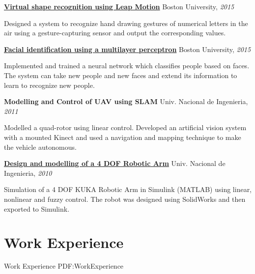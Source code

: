 \documentclass[letterpaper,MMMyyyy,nonstop]{simpleresumecv}
\begin{document}
\begin{body}
\BigGap
\href{http://www.bu.edu/vip/files/pubs/reports/DLDP15-03buece.pdf}
{\textbf{Virtual shape recognition using Leap Motion}}
\hfill
Boston University, \textit{2015}

\GapNoBreak
\BulletItem
Designed a system to recognize hand drawing gestures of numerical letters in the air using a gesture-capturing sensor and  output the corresponding values.
\GapNoBreak

\BigGap
\href{https://docs.google.com/presentation/d/1328Qvm9VlAZadwlNoU3n5m1REY36m_hGcakSYlxW2vM/edit?ts=565d2938#slide=id.p}
{\textbf{Facial identification using a multilayer perceptron}}
\hfill
Boston University, \textit{2015}

\GapNoBreak
\BulletItem
Implemented and trained a neural network which classifies people based on faces. The system can take new people and new faces and extend its information to learn to recognize new people.
\GapNoBreak

\BigGap
\textbf{Modelling and Control of UAV using SLAM}
\hfill
Univ. Nacional de Ingenieria, \textit{2011}

\GapNoBreak
\BulletItem
Modelled a quad-rotor using linear control. Developed an artificial vision system with a mounted Kinect and used a navigation and mapping technique to make the vehicle autonomous.
\GapNoBreak

\BigGap
\href{https://github.com/davidlavy88/resume/blob/master/Paper/paper-mt-517.pdf}
{\textbf{Design and modelling of a 4 DOF Robotic Arm}}
\hfill
Univ. Nacional de Ingenieria, \textit{2010}

\GapNoBreak
\BulletItem
Simulation of a 4 DOF KUKA Robotic Arm in Simulink (MATLAB) using linear, nonlinear and fuzzy control. The robot was designed using SolidWorks and then exported to Simulink.
\GapNoBreak

%


\section
{Work Experience}
{Work Experience}
{PDF:WorkExperience}


\end{body}
\end{document}
